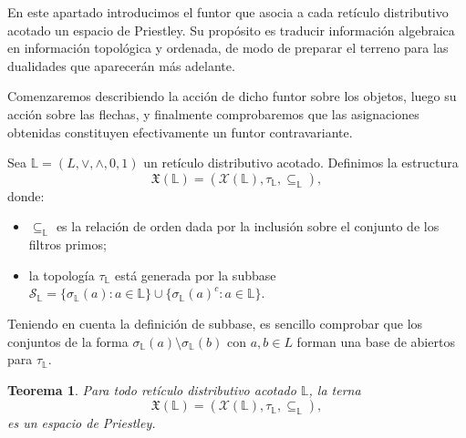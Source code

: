 \documentclass[12pt]{book}
\newtheorem{theorem}{Teorema}[section]
\newcommand{\X}{\mathfrak{X}}
\begin{document}
En este apartado introducimos el funtor que asocia a cada retículo distributivo acotado un espacio de Priestley. Su propósito es traducir información algebraica en información topológica y ordenada, de modo de preparar el terreno para las dualidades que aparecerán más adelante. 

Comenzaremos describiendo la acción de dicho funtor sobre los objetos, luego su acción sobre las flechas, y finalmente comprobaremos que las asignaciones obtenidas constituyen efectivamente un funtor contravariante.


Sea $\mathbb{L} = (L,\vee,\wedge,0,1)$ un retículo distributivo acotado. Definimos la estructura
\[
\X(\mathbb{L}) = (\mathcal{X}(\mathbb{L}),\tau_{\mathbb{L}},\subseteq_{\mathbb{L}}),
\]
donde:
\begin{itemize}
  \item \( \subseteq_{\mathbb{L}} \) es la relación de orden dada por la inclusión sobre el conjunto de los filtros primos;
  \item la topología \( \tau_{\mathbb{L}} \) está generada por la subbase
        \(
        \mathscr{S}_{\mathbb{L}} = \{ \sigma_{\mathbb{L}}(a) \colon a \in \mathbb{L} \} \cup \{ \sigma_{\mathbb{L}}(a)^{c} \colon a \in \mathbb{L} \}.
        \)
\end{itemize}
Teniendo en cuenta la definición de subbase, es sencillo comprobar que los conjuntos de la forma \( \sigma_{\mathbb{L}}(a)\setminus\sigma_{\mathbb{L}}(b) \)
con \( a,b\in L \) forman una base de abiertos para \( \tau_{\mathbb{L}} \).

\begin{theorem}\label{thm:X_bien_definido}
Para todo retículo distributivo acotado \( \mathbb{L} \),
la terna
\[
\X(\mathbb{L}) = (\mathcal{X}(\mathbb{L}),\tau_{\mathbb{L}},\subseteq_{\mathbb{L}}),
\]
es un espacio de Priestley.
\end{theorem}
\end{document}
